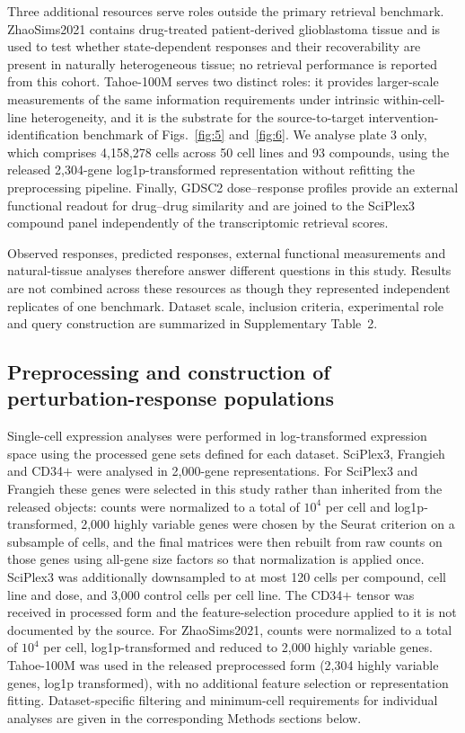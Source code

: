 \documentclass[11pt,letterpaper]{article}
\begin{document}
Three additional resources serve roles outside the primary retrieval benchmark. ZhaoSims2021\cite{dataZhao} contains drug-treated patient-derived glioblastoma tissue and is used to test whether state-dependent responses and their recoverability are present in naturally heterogeneous tissue; no retrieval performance is reported from this cohort. Tahoe-100M\cite{Tahoe100M} serves two distinct roles: it provides larger-scale measurements of the same information requirements under intrinsic within-cell-line heterogeneity, and it is the substrate for the source-to-target intervention-identification benchmark of Figs.~\ref{fig:5} and~\ref{fig:6}. We analyse plate 3 only, which comprises 4,158,278 cells across 50 cell lines and 93 compounds, using the released 2,304-gene log1p-transformed representation without refitting the preprocessing pipeline. Finally, GDSC2 dose--response profiles provide an external functional readout for drug--drug similarity and are joined to the SciPlex3 compound panel independently of the transcriptomic retrieval scores.

Observed responses, predicted responses, external functional measurements and natural-tissue analyses therefore answer different questions in this study. Results are not combined across these resources as though they represented independent replicates of one benchmark. Dataset scale, inclusion criteria, experimental role and query construction are summarized in Supplementary Table~2.


\subsection*{Preprocessing and construction of perturbation-response populations}

Single-cell expression analyses were performed in log-transformed expression space using the processed gene sets defined for each dataset. SciPlex3, Frangieh and CD34$+$ were analysed in 2,000-gene representations. For SciPlex3 and
Frangieh these genes were selected in this study rather than inherited from the released objects:
counts were normalized to a total of $10^4$ per cell and log1p-transformed, 2,000 highly variable
genes were chosen by the Seurat criterion\cite{Seurat} on a subsample of cells, and the final matrices were then
rebuilt from raw counts on those genes using all-gene size factors so that normalization is applied
once. SciPlex3 was additionally downsampled to at most 120 cells per compound, cell line and dose,
and 3,000 control cells per cell line. The CD34$+$ tensor was received in processed form and the feature-selection
procedure applied to it is not documented by the source. For ZhaoSims2021, counts were normalized to a total of $10^4$ per cell, log1p-transformed and reduced to 2,000 highly variable genes. Tahoe-100M was used in the released preprocessed form (2,304 highly variable genes, log1p transformed), with no additional feature selection or representation fitting. Dataset-specific filtering and minimum-cell requirements for individual analyses are given in the corresponding Methods sections below.
\end{document}
